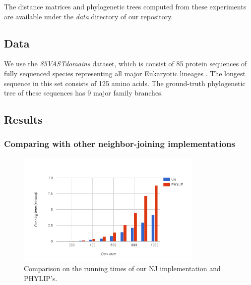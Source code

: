 \documentclass[11pt,letterpaper]{article}
\theoremstyle{definition}
\begin{document}



The distance matrices and phylogenetic trees computed from these experiments are available under the \textit{data} directory of our repository. 

\subsection{Data}

We use the \textit{85VASTdomains} dataset, which is consist of 85 protein sequences of fully sequenced species representing all major Eukaryotic lineages \cite{khafif2014identification}. The longest sequence in this set consists of 125 amino acids. The ground-truth phylogenetic tree of these sequences has 9 major family branches.

\subsection{Results}

\subsubsection{Comparing with other neighbor-joining implementations}

\begin{figure}[t]
  \centering
  \includegraphics[width=0.8\textwidth]{runningtime.png}
  \caption{Comparison on the running times of our NJ implementation and PHYLIP's.}
  \label{fig:runningtime}
\end{figure}
\end{document}
